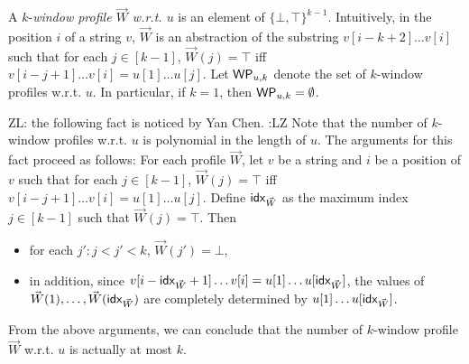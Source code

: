 \documentclass{llncs}
\newcommand{\zhilin}[1]{\color{cyan} {ZL: #1 :LZ} \color{black}}
\begin{document}
A $k$-\emph{window profile $\vec{W}$ w.r.t. $u$} is an element of $\{\bot,\top\}^{k-1}$. Intuitively, in the position $i$ of a string $v$, $\vec{W}$ is an abstraction of the substring $v[i-k+2] \dots v[i]$ such that for each $j \in [k-1]$, $\vec{W}(j) = \top$ iff $v[i-j+1] \dots v[i] = u[1] \dots u[j]$. Let $\mathsf{WP}_{u, k}$ denote the set of $k$-window profiles w.r.t. $u$. In particular, if $k = 1$, then $\mathsf{WP}_{u, k} = \emptyset$. 

\zhilin{the following fact is noticed by Yan Chen.} 
Note that the number of $k$-window profiles w.r.t. $u$ is polynomial in the length of $u$. The arguments for this fact proceed as follows: For each profile $\vec{W}$, let $v$ be a string and $i$ be a position of $v$ such that for each $j \in [k-1]$, $\vec{W}(j) = \top$ iff $v[i-j+1] \dots v[i] = u[1] \dots u[j]$. Define ${\sf idx}_{\vec{W}}$ as the maximum index $j \in [k-1]$ such that $\vec{W}(j)=\top$. Then 
\begin{itemize}
\item for each $j': j < j' < k$, $\vec{W}(j')=\bot$, 
\item in addition, since $v[i-{\sf idx}_{\vec{W}}+1] \dots v[i] = u[1] \dots u[{\sf idx}_{\vec{W}}]$, the values of $\vec{W}(1),\dots, \vec{W}({\sf idx}_{\vec{W}})$ are completely determined by $u[1] \dots u[{\sf idx}_{\vec{W}}]$.
\end{itemize}
From the above arguments, we can  conclude that the number of $k$-window profile $\vec{W}$ w.r.t. $u$ is actually at most $k$.

\smallskip
\end{document}
